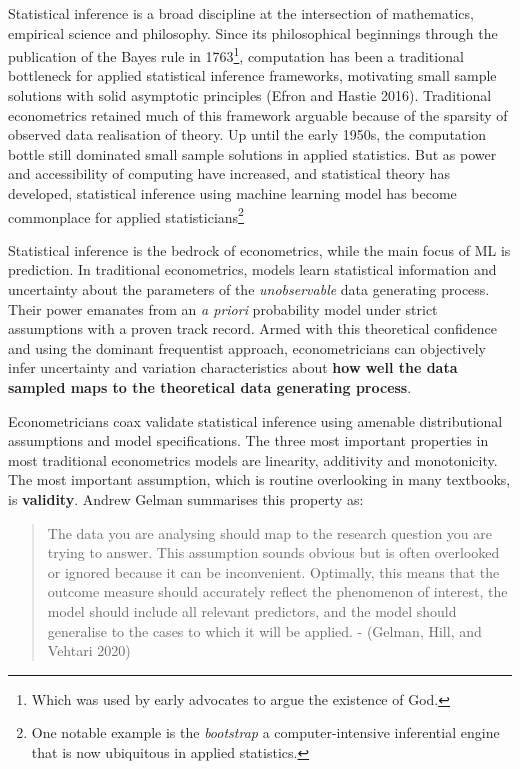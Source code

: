 \documentclass{article}
\begin{document}
Statistical inference is a broad discipline at the intersection of
mathematics, empirical science and philosophy. Since its philosophical
beginnings through the publication of the Bayes rule in 1763\footnote{Which
  was used by early advocates to argue the existence of God.},
computation has been a traditional bottleneck for applied statistical
inference frameworks, motivating small sample solutions with solid
asymptotic principles (Efron and Hastie 2016). Traditional econometrics
retained much of this framework arguable because of the sparsity of
observed data realisation of theory. Up until the early 1950s, the
computation bottle still dominated small sample solutions in applied
statistics. But as power and accessibility of computing have increased,
and statistical theory has developed, statistical inference using
machine learning model has become commonplace for applied
statisticians\footnote{One notable example is the \emph{bootstrap} a
  computer-intensive inferential engine that is now ubiquitous in
  applied statistics.}

Statistical inference is the bedrock of econometrics, while the main
focus of ML is prediction. In traditional econometrics, models learn
statistical information and uncertainty about the parameters of the
\emph{unobservable} data generating process. Their power emanates from
an \emph{a priori} probability model under strict assumptions with a
proven track record. Armed with this theoretical confidence and using
the dominant frequentist approach, econometricians can objectively infer
uncertainty and variation characteristics about \textbf{how well the
data sampled maps to the theoretical data generating process}.

Econometricians coax validate statistical inference using amenable
distributional assumptions and model specifications. The three most
important properties in most traditional econometrics models are
linearity, additivity and monotonicity. The most important assumption,
which is routine overlooking in many textbooks, is \textbf{validity}.
Andrew Gelman summarises this property as:

\begin{quote}
The data you are analysing should map to the research question you are
trying to answer. This assumption sounds obvious but is often overlooked
or ignored because it can be inconvenient. Optimally, this means that
the outcome measure should accurately reflect the phenomenon of
interest, the model should include all relevant predictors, and the
model should generalise to the cases to which it will be applied. -
(Gelman, Hill, and Vehtari 2020)
\end{quote}
\end{document}
